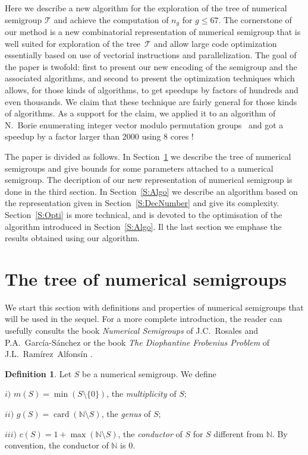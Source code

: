 \documentclass[reqno,11pt]{amsart}
\theoremstyle{plain}
\theoremstyle{definition}
\newtheorem{defi}[prop]{Definition}
\renewcommand{\leq}{\leqslant}
\newcommand{\NN}{\mathbb{N}}
\DeclareMathOperator{\card}{card}
\begin{document}
Here we describe a new algorithm for the exploration of the tree of numerical
semigroup $\mathcal{T}$ and achieve the computation of $n_g$ for $g\leq 67$.
The cornerstone of our method is a new combinatorial representation of
numerical semigroup that is well suited for exploration of the
tree~$\mathcal{T}$ and allow large code optimization essentially based on use of
vectorial instructions and parallelization.
The goal of the paper is twofold:
first to present our new encoding of the semigroup and the associated
algorithms, and second to present the optimization techniques which allows, for
those kinds of algorithms, to get speedups by factors of hundreds and even
thousands. We claim that these technique are fairly general for those kinds of
algorithms. As a support for the claim, we applied it to an algorithm of
N.~Borie enumerating integer vector modulo permutation groups~\cite{Borie} and
got a speedup by a factor larger than 2000 using 8 cores !

The paper is divided as follows.
In Section~\ref{S:Tree} we describe the tree of numerical semigroups and give bounds for some parameters attached to a numerical semigroup.
The decription of our new representation of numerical semigroup is done in the third section.
In Section~\ref{S:Algo} we describe an algorithm based on the representation given in Section~\ref{S:DecNumber} and give its complexity. 
Section~\ref{S:Opti} is more technical, and is devoted to the optimisation of the algorithm introduced in Section~\ref{S:Algo}.
Il the last section we emphase the results obtained using our algorithm.

\section{The tree of numerical semigroups}
\label{S:Tree}

We start this section with definitions and properties of numerical semigroups that will be used in the sequel.
For a more complete introduction, the reader can usefully consults the book \emph{Numerical Semigroups} of J.C.~Rosales and P.A.~Garc\'ia-S\'anchez \cite{BookNS} or the book \emph{The Diophantine Frobenius Problem} of J.L.~Ram\'irez~Alfons\'in \cite{BookDFP}.

\begin{defi}
Let $S$ be a numerical semigroup. We define 

$i)$ $m(S)=\min(S\setminus\{0\})$, the \emph{multiplicity} of $S$;

$ii)$ $g(S)=\card(\NN\setminus S)$, the \emph{genus} of $S$;

$iii)$ $c(S)=1+\max(\NN\setminus S)$, the \emph{conductor} of $S$ for $S$ different from $\NN$. By convention, the conductor of $\NN$ is $0$. 
\end{defi}
\end{document}
